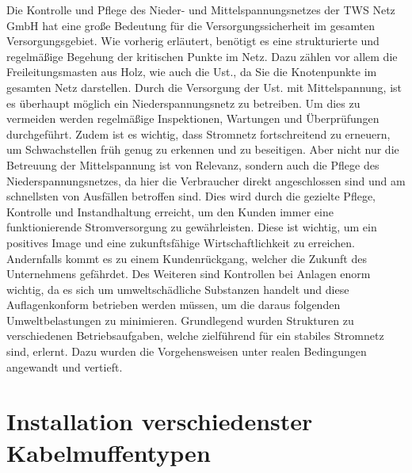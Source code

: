 Die Kontrolle und Pflege des Nieder- und Mittelspannungsnetzes der TWS Netz GmbH hat eine große Bedeutung für die Versorgungssicherheit im gesamten 
Versorgungsgebiet. Wie vorherig erläutert, benötigt es eine strukturierte und regelmäßige Begehung der kritischen Punkte im Netz. Dazu zählen vor allem die 
Freileitungsmasten aus Holz, wie auch die Ust., da Sie die Knotenpunkte im gesamten Netz darstellen. Durch die Versorgung der Ust. mit Mittelspannung, ist es 
überhaupt möglich ein Niederspannungsnetz zu betreiben. Um dies zu vermeiden werden regelmäßige Inspektionen, Wartungen und Überprüfungen durchgeführt. 
Zudem ist es wichtig, dass Stromnetz fortschreitend zu erneuern, um Schwachstellen früh genug zu erkennen und zu beseitigen. Aber nicht nur die Betreuung 
der Mittelspannung ist von Relevanz, sondern auch die Pflege des Niederspannungsnetzes, da hier die Verbraucher direkt angeschlossen sind und am schnellsten 
von Ausfällen betroffen sind. Dies wird durch die gezielte Pflege, Kontrolle und Instandhaltung erreicht, um den Kunden immer eine funktionierende 
Stromversorgung zu gewährleisten. Diese ist wichtig, um ein positives Image und eine zukunftsfähige Wirtschaftlichkeit zu erreichen. Andernfalls kommt es zu 
einem Kundenrückgang, welcher die Zukunft des Unternehmens gefährdet. Des Weiteren sind Kontrollen bei  Anlagen enorm wichtig, da es sich um 
umweltschädliche Substanzen handelt und diese Auflagenkonform betrieben werden müssen, um die daraus folgenden Umweltbelastungen zu minimieren. Grundlegend 
wurden Strukturen zu verschiedenen Betriebsaufgaben, welche zielführend für ein stabiles Stromnetz sind, erlernt. Dazu wurden die Vorgehensweisen unter 
realen Bedingungen angewandt und vertieft.
\clearpage

\section{Installation verschiedenster Kabelmuffentypen}

